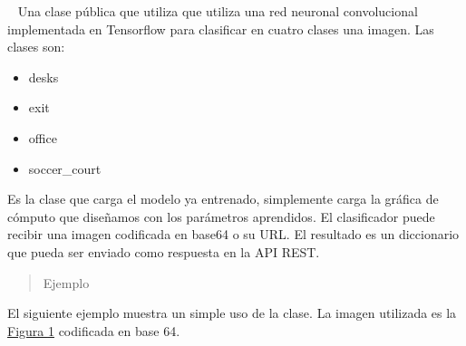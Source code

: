 \begin{fulllineitems}
\label{\detokenize{chapter_two/desc_cloudnao:app.tf_models.indoor_scenes_classifier.ImageClassifier}}~
Una clase pública que utiliza que utiliza una red neuronal
convolucional implementada en Tensorflow para clasificar en cuatro
clases una imagen. Las clases son:
\begin{itemize}
\item {} 
desks

\item {} 
exit

\item {} 
office

\item {} 
soccer\_court

\end{itemize}

Es la clase que carga el modelo ya entrenado, simplemente carga
la gráfica de cómputo que diseñamos con los parámetros
aprendidos. El clasificador puede
recibir una imagen codificada en base64 o su URL. El resultado
es un diccionario que pueda ser enviado como respuesta en la API
REST.
\begin{quote}\begin{description}
\item[{Ejemplo}] \leavevmode
\end{description}\end{quote}

El siguiente ejemplo
muestra un simple uso de la clase. La imagen utilizada es la \hyperref[\detokenize{chapter_two/desc_cloudnao:image-class-example}]{Figura \ref{\detokenize{chapter_two/desc_cloudnao:image-class-example}}}
codificada en base 64.

\begin{figure}[htbp]
\centering

\noindent{}
\label{\detokenize{chapter_two/desc_cloudnao:image-class-example}}\end{figure}

\begin{sphinxVerbatim}[commandchars=\\\{\}]
   
  
  
\end{sphinxVerbatim}


\end{fulllineitems}
